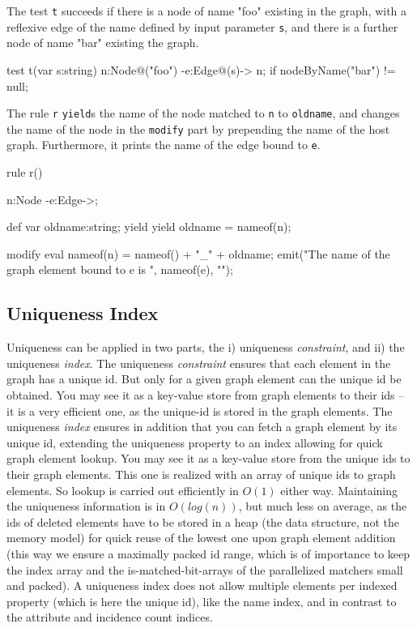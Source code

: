 \begin{example}
The test \texttt{t} succeeds if there is a node of name "foo" existing in the graph, with a reflexive edge of the name defined by input parameter \texttt{s}, and there is a further node of name "bar" existing the graph.

\begin{grgen}
test t(var s:string) {
  n:Node{@("foo")} -e:Edge{@(s)}-> n;
  if{ nodeByName("bar") != null; }
}
\end{grgen}

The rule \texttt{r} \texttt{yield}s the name of the node matched to \texttt{n} to \texttt{oldname}, and changes the name of the node in the \texttt{modify} part by prepending the name of the host graph. Furthermore, it prints the name of the edge bound to \texttt{e}.

\begin{grgen}
rule r() {
  n:Node -e:Edge->;

  def var oldname:string;
  yield { yield oldname = nameof(n); }
		
  modify {
    eval {
      nameof(n) = nameof() + "_" + oldname;
    }
    emit("The name of the graph element bound to e is ", nameof(e), "\n");
  }
}
\end{grgen}

\end{example}


\subsection{Uniqueness Index}\label{sec:uniqueness}
Uniqueness can be applied in two parts, the i) uniqueness \emph{constraint}, and ii) the uniqueness \emph{index}.
The uniqueness \emph{constraint} ensures that each element in the graph has a unique id. 
But only for a given graph element can the unique id be obtained.
You may see it as a key-value store from graph elements to their ids -- it is a very efficient one, as the unique-id is stored in the graph elements. 
The uniqueness \emph{index} ensures in addition that you can fetch a graph element by its unique id, extending the uniqueness property to an index allowing for quick graph element lookup.
You may see it as a key-value store from the unique ids to their graph elements.
This one is realized with an array of unique ids to graph elements.
So lookup is carried out efficiently in $O(1)$ either way.
Maintaining the uniqueness information is in $O(log(n))$, but much less on average, as the ids of deleted elements have to be stored in a heap (the data structure, not the memory model) for quick reuse of the lowest one upon graph element addition (this way we ensure a maximally packed id range, which is of importance to keep the index array and the is-matched-bit-arrays of the parallelized matchers small and packed).
A uniqueness index does not allow multiple elements per indexed property (which is here the unique id), like the name index, and in contrast to the attribute and incidence count indices.

